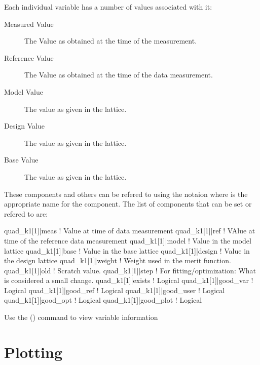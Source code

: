 Each individual variable has a number of values associated with it:
  \vspace*{-3ex}
  \begin{description}
  \item[Measured Value] \Newline
The Value as obtained at the time of the  measurement.
  \item[Reference Value] \Newline
The Value as obtained at the time of the  data  measurement.
  \item[Model Value] \Newline
The value as given in the  lattice.
  \item[Design Value] \Newline
The value as given in the  lattice.
  \item[Base Value] \Newline
The value as given in the  lattice.
  \end{description}
These components and others can be refered to using the notaion
 where  is the appropriate name for the
component. The list of components that can be set or refered to are:
\begin{example}
  quad_k1[1]|meas      ! Value at time of data measurement
  quad_k1[1]|ref       ! VAlue at time of the reference data measurement
  quad_k1[1]|model     ! Value in the model lattice
  quad_k1[1]|base      ! Value in the base lattice
  quad_k1[1]|design    ! Value in  the design lattice
  quad_k1[1]|weight    ! Weight used in the merit function.
  quad_k1[1]|old       ! Scratch value.
  quad_k1[1]|step      ! For fitting/optimization: What is considered a small change.
  quad_k1[1]|exists    ! Logical
  quad_k1[1]|good_var  ! Logical
  quad_k1[1]|good_ref  ! Logical
  quad_k1[1]|good_user ! Logical
  quad_k1[1]|good_opt  ! Logical
  quad_k1[1]|good_plot ! Logical
\end{example}

Use the  () command to view variable information

\section{Plotting}
\label{s:arithmetic}

